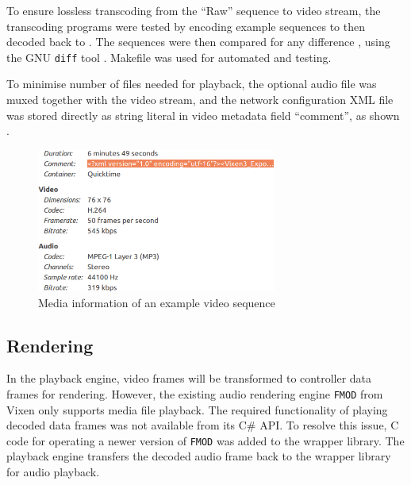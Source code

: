 To ensure lossless transcoding from the ``Raw'' sequence to  video stream, the transcoding programs were tested by encoding example sequences to  then decoded back to . The  sequences were then compared for any difference , using the GNU \texttt{diff} tool \cite{diff}. Makefile was used for automated  and testing.

To minimise number of files needed for playback, the optional audio file was muxed together with the video stream, and the network configuration XML file was stored directly as  string literal in  video metadata field  ``comment'', as shown  .

\begin{figure}[t]
  \centering
  \includegraphics[width=0.7\textwidth]{Figs/video_info.png}
  \caption{\footnotesize Media information of an example video sequence}
  \label{fig:video-info}
\end{figure}

\subsection{Rendering}

In the playback engine, video frames will be transformed to controller data frames for rendering. However, the existing audio rendering engine \texttt{FMOD} from Vixen only supports media file playback. The required functionality of playing decoded  data frames was not available from its C\# API. To resolve this issue, C code for operating a newer version of \texttt{FMOD} was added to the wrapper library. The playback engine transfers the decoded audio frame back to the wrapper library for audio playback.


